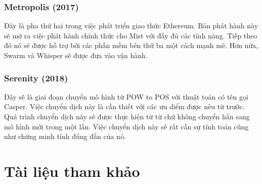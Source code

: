 \documentclass[12pt]{article}
\begin{document}
	\subsubsection{Metropolis (2017)}
	Đây là pha thứ hai trong việc phát triển giao thức Ethereum. Bản phát hành này sẽ mở ra việc phát hành chính thức cho Mist với đầy đủ các tính năng. Tiếp theo đó nó sẽ được hỗ trợ bởi các phần mềm bên thứ ba một cách mạnh mẽ. Hơn nữa, Swarm và Whisper sẽ được đưa vào vận hành.

	\subsubsection{Serenity (2018)}
	Đây sẽ là giai đoạn chuyển mô hình từ POW to POS với thuật toán có tên gọi Casper. Việc chuyển dịch này là cần thiết với các ưu diểm được nêu từ trước. Quá trình chuyển dịch này sẽ được thực hiện từ từ chứ không chuyển hẳn sang mô hình mới trong một lần. Việc chuyển dịch này sẽ rất cần sự tính toán cũng như chứng minh tính đúng đắn của nó.
	
	\section{Tài liệu tham khảo}
	
\end{document}
